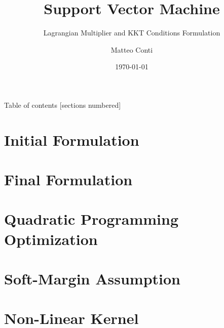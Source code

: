 \documentclass[10pt]{beamer}
\title{Support Vector Machine}
\subtitle{Lagrangian Multiplier and KKT Conditions Formulation}
\date{\today}
\author{Matteo Conti}
\begin{document}
\maketitle

\begin{frame}{Table of contents}
  [sections numbered]
  \tableofcontents[hideallsubsections]
\end{frame}


\section{Initial Formulation}



\section{Final Formulation}



\section{Quadratic Programming Optimization}



\section{Soft-Margin Assumption}



\section{Non-Linear Kernel}



\end{document}
